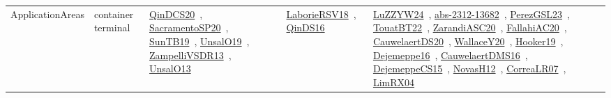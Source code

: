 {\begin{longtable}{lp{3cm}>{\raggedright\arraybackslash}p{6cm}>{\raggedright\arraybackslash}p{6cm}>{\raggedright\arraybackslash}p{8cm}}
\index{container terminal}\index{ApplicationAreas!container terminal}ApplicationAreas & container terminal & \href{../works/QinDCS20.pdf}{QinDCS20}~\cite{QinDCS20}, \href{../works/SacramentoSP20.pdf}{SacramentoSP20}~\cite{SacramentoSP20}, \href{../works/SunTB19.pdf}{SunTB19}~\cite{SunTB19}, \href{../works/UnsalO19.pdf}{UnsalO19}~\cite{UnsalO19}, \href{../works/ZampelliVSDR13.pdf}{ZampelliVSDR13}~\cite{ZampelliVSDR13}, \href{../works/UnsalO13.pdf}{UnsalO13}~\cite{UnsalO13} & \href{../works/LaborieRSV18.pdf}{LaborieRSV18}~\cite{LaborieRSV18}, \href{../works/QinDS16.pdf}{QinDS16}~\cite{QinDS16} & \href{../works/LuZZYW24.pdf}{LuZZYW24}~\cite{LuZZYW24}, \href{../works/abs-2312-13682.pdf}{abs-2312-13682}~\cite{abs-2312-13682}, \href{../works/PerezGSL23.pdf}{PerezGSL23}~\cite{PerezGSL23}, \href{../works/TouatBT22.pdf}{TouatBT22}~\cite{TouatBT22}, \href{../works/ZarandiASC20.pdf}{ZarandiASC20}~\cite{ZarandiASC20}, \href{../works/FallahiAC20.pdf}{FallahiAC20}~\cite{FallahiAC20}, \href{../works/CauwelaertDS20.pdf}{CauwelaertDS20}~\cite{CauwelaertDS20}, \href{../works/WallaceY20.pdf}{WallaceY20}~\cite{WallaceY20}, \href{../works/Hooker19.pdf}{Hooker19}~\cite{Hooker19}, \href{../works/Dejemeppe16.pdf}{Dejemeppe16}~\cite{Dejemeppe16}, \href{../works/CauwelaertDMS16.pdf}{CauwelaertDMS16}~\cite{CauwelaertDMS16}, \href{../works/DejemeppeCS15.pdf}{DejemeppeCS15}~\cite{DejemeppeCS15}, \href{../works/NovasH12.pdf}{NovasH12}~\cite{NovasH12}, \href{../works/CorreaLR07.pdf}{CorreaLR07}~\cite{CorreaLR07}, \href{../works/LimRX04.pdf}{LimRX04}~\cite{LimRX04}\\

\end{longtable}}
